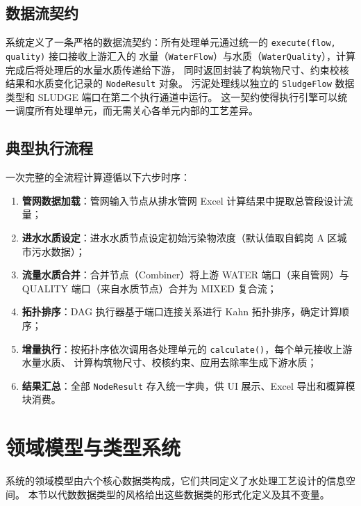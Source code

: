 \documentclass[12pt,a4paper]{ctexart}
\theoremstyle{definition}
\theoremstyle{remark}
\begin{document}
\subsection{数据流契约}

系统定义了一条严格的数据流契约：所有处理单元通过统一的 \texttt{execute(flow, quality)} 接口接收上游汇入的
水量（\texttt{WaterFlow}）与水质（\texttt{WaterQuality}），计算完成后将处理后的水量水质传递给下游，
同时返回封装了构筑物尺寸、约束校核结果和水质变化记录的 \texttt{NodeResult} 对象。
污泥处理线以独立的 \texttt{SludgeFlow} 数据类型和 SLUDGE 端口在第二个执行通道中运行。
这一契约使得执行引擎可以统一调度所有处理单元，而无需关心各单元内部的工艺差异。

\subsection{典型执行流程}

一次完整的全流程计算遵循以下六步时序：
\begin{enumerate}
  \item \textbf{管网数据加载}：管网输入节点从排水管网 Excel 计算结果中提取总管段设计流量；
  \item \textbf{进水水质设定}：进水水质节点设定初始污染物浓度（默认值取自鹤岗 A 区城市污水数据）；
  \item \textbf{流量水质合并}：合并节点（Combiner）将上游 WATER 端口（来自管网）与 QUALITY 端口（来自水质节点）合并为 MIXED 复合流；
  \item \textbf{拓扑排序}：DAG 执行器基于端口连接关系进行 Kahn 拓扑排序，确定计算顺序；
  \item \textbf{增量执行}：按拓扑序依次调用各处理单元的 \texttt{calculate()}，每个单元接收上游水量水质、
        计算构筑物尺寸、校核约束、应用去除率生成下游水质；
  \item \textbf{结果汇总}：全部 \texttt{NodeResult} 存入统一字典，供 UI 展示、Excel 导出和概算模块消费。
\end{enumerate}

\section{领域模型与类型系统}\label{sec:domain-model}

系统的领域模型由六个核心数据类构成，它们共同定义了水处理工艺设计的信息空间。
本节以代数数据类型的风格给出这些数据类的形式化定义及其不变量。
\end{document}
